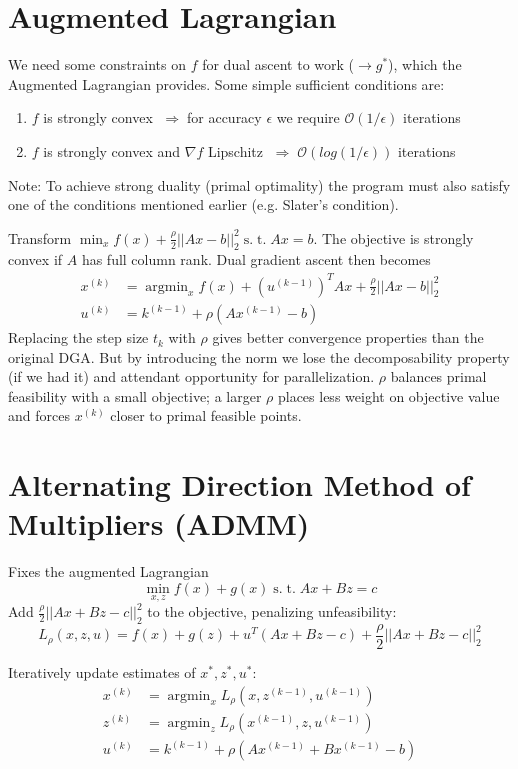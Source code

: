 \documentclass[10pt]{article}
\DeclareMathOperator*{\argmin}{argmin}
\renewcommand{\O}{\ensuremath{\mathcal{O}}}
\newcommand{\st}{\ensuremath{\;\mathrm{s.}\;\mathrm{t.}\;}}
\newcommand{\then}{\ensuremath{\;\Rightarrow\;}}
\begin{document}
\section{Augmented Lagrangian}
We need some constraints on $f$ for dual ascent to work ($\to g^*$), which the Augmented Lagrangian provides.  Some simple sufficient conditions are:
\begin{enumerate}
\item $f$ is strongly convex \then for accuracy $\epsilon$ we require $\O(1/\epsilon)$ iterations
\item $f$ is strongly convex and $\nabla f$ Lipschitz $\then\O(log(1/\epsilon))$ iterations
  \end{enumerate}
    Note: To achieve strong duality (primal optimality) the program must also satisfy one of the conditions mentioned earlier (e.g. Slater's condition).

    Transform $\min_xf(x)+\frac{\rho}{2}||Ax-b||_2^2 \st Ax=b$.  The objective is strongly convex if $A$ has full column rank.  Dual gradient ascent then becomes
    \begin{align*}
      x^{(k)}&=\argmin_xf(x)+(u^{(k-1)})^TAx+\frac{\rho}{2}||Ax-b||_2^2\\ %
    u^{(k)} &= k^{(k-1)}+\rho(Ax^{(k-1)}-b)
    \end{align*}
    Replacing the step size $t_k$ with $\rho$ gives better convergence properties than the original DGA.  But by introducing the norm we lose the decomposability property (if we had it) and  attendant opportunity for parallelization.
$\rho$ balances primal feasibility with a small objective; a larger $\rho$ places less weight on objective value and forces $x^{(k)}$ closer to primal feasible points.
    
\section{Alternating Direction Method of Multipliers (ADMM)}
Fixes the augmented Lagrangian
\[\min_{x,z}f(x)+g(x) \st Ax+Bz=c\]
Add $\frac{\rho}{2}||Ax+Bz-c||_2^2$ to the objective, penalizing unfeasibility:
\[
L_\rho(x,z,u)=f(x)+g(z)+u^T(Ax+Bz-c) + \frac{\rho}{2}||Ax+Bz-c||_2^2
\]

Iteratively update estimates of $x^*,z^*,u^*$:
\begin{align*}
  x^{(k)}&=\argmin_xL_\rho(x,z^{(k-1)},u^{(k-1)})\\
z^{(k)}&=\argmin_zL_\rho(x^{(k-1)},z,u^{(k-1)})\\
u^{(k)} &= k^{(k-1)}+\rho(Ax^{(k-1)}+Bx^{(k-1)}-b)\\
\end{align*}
\end{document}
